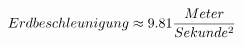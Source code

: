 \documentclass[preview]{standalone}
\begin{document}
\begin{align*}
\special{dvisvgm:raw <g id='unique000'>}Erdbeschleunigung \approx 9.81 \frac{Meter}{Sekunde^{2}}\special{dvisvgm:raw </g>}
\end{align*}
\end{document}
